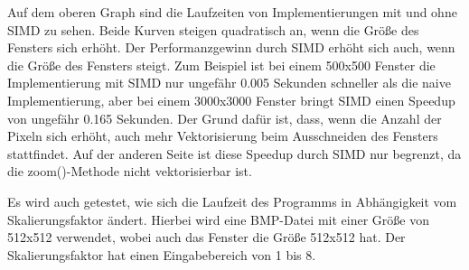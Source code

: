 \documentclass[course=erap]{aspdoc}
\begin{document}
    \begin{center}
    \end{center}

    Auf dem oberen Graph sind die Laufzeiten von Implementierungen mit und ohne SIMD zu sehen. Beide Kurven steigen quadratisch an,
    wenn die Größe des Fensters sich erhöht. Der Performanzgewinn durch SIMD erhöht sich auch, wenn die Größe des Fensters steigt.
    Zum Beispiel ist bei einem 500x500 Fenster die Implementierung mit SIMD nur ungefähr 0.005 Sekunden schneller als die naive
    Implementierung, aber bei einem 3000x3000 Fenster bringt SIMD einen Speedup von ungefähr 0.165 Sekunden. Der Grund dafür ist,
    dass, wenn die Anzahl der Pixeln sich erhöht, auch mehr Vektorisierung beim Ausschneiden des Fensters stattfindet. Auf der
    anderen Seite ist diese Speedup durch SIMD nur begrenzt, da die zoom()-Methode nicht vektorisierbar ist.

    Es wird auch getestet, wie sich die Laufzeit des Programms in Abhängigkeit vom Skalierungsfaktor ändert. Hierbei wird eine
    BMP-Datei mit einer Größe von 512x512 verwendet, wobei auch das Fenster die Größe 512x512 hat. Der Skalierungsfaktor hat einen
    Eingabebereich von 1 bis 8.
\end{document}
